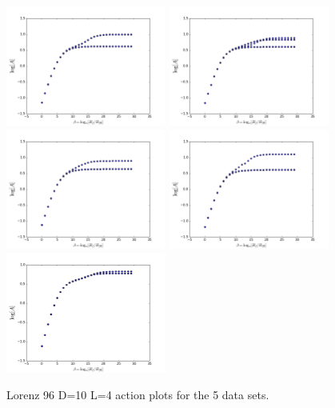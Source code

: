 \documentclass[11pt]{article}
\begin{document}
{\begin{figure}[h]
\centering
\includegraphics[width=0.47\textwidth]{figure/Lorenz96_multiple/action_path_1.png}
\includegraphics[width=0.47\textwidth]{figure/Lorenz96_multiple/action_path_2.png} \\
\includegraphics[width=0.47\textwidth]{figure/Lorenz96_multiple/action_path_3.png}
\includegraphics[width=0.47\textwidth]{figure/Lorenz96_multiple/action_path_4.png} \\
\includegraphics[width=0.47\textwidth]{figure/Lorenz96_multiple/action_path_5.png}
\caption{Lorenz 96 D=10 L=4 action plots for the 5 data sets.}
\label{fig:lorenz96_multiple}
\end{figure}

}
\end{document}
